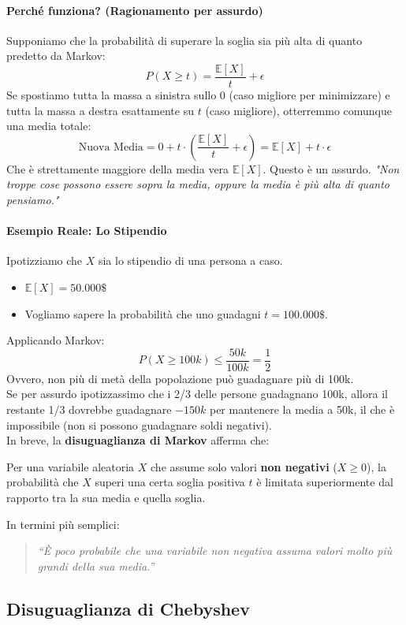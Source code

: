 \paragraph{Perché funziona? (Ragionamento per assurdo)}
Supponiamo che la probabilità di superare la soglia sia più alta di quanto predetto da Markov:
\[ P(X \ge t) = \frac{\mathbb{E}[X]}{t} + \epsilon \]
Se spostiamo tutta la massa a sinistra sullo 0 (caso migliore per minimizzare) e tutta la massa a destra esattamente su $t$ (caso migliore), otterremmo comunque una media totale:
\[ \text{Nuova Media} = 0 + t \cdot \left(\frac{\mathbb{E}[X]}{t} + \epsilon\right) = \mathbb{E}[X] + t\cdot\epsilon \]
Che è strettamente maggiore della media vera $\mathbb{E}[X]$. Questo è un assurdo. 
\textit{"Non troppe cose possono essere sopra la media, oppure la media è più alta di quanto pensiamo."}

\paragraph{Esempio Reale: Lo Stipendio}
Ipotizziamo che $X$ sia lo stipendio di una persona a caso.
\begin{itemize}
    \item $\mathbb{E}[X] = 50.000\$$
    \item Vogliamo sapere la probabilità che uno guadagni $t = 100.000\$$.
\end{itemize}
Applicando Markov:
\[ P(X \ge 100k) \le \frac{50k}{100k} = \frac{1}{2} \]
Ovvero, non più di metà della popolazione può guadagnare più di 100k.
\\Se per assurdo ipotizzassimo che i 2/3 delle persone guadagnano 100k, allora il restante 1/3 dovrebbe guadagnare $-150k$ per mantenere la media a 50k, il che è impossibile (non si possono guadagnare soldi negativi).
\\In breve, la \textbf{disuguaglianza di Markov} afferma che:

Per una variabile aleatoria $X$ che assume solo valori \textbf{non negativi} ($X \ge 0$), la probabilità che $X$ superi una certa soglia positiva $t$ è limitata superiormente dal rapporto tra la sua media e quella soglia.

In termini più semplici:
\begin{quote}
    \textit{``È poco probabile che una variabile non negativa assuma valori molto più grandi della sua media.''}
\end{quote}

\newpage
\subsection{Disuguaglianza di Chebyshev}

